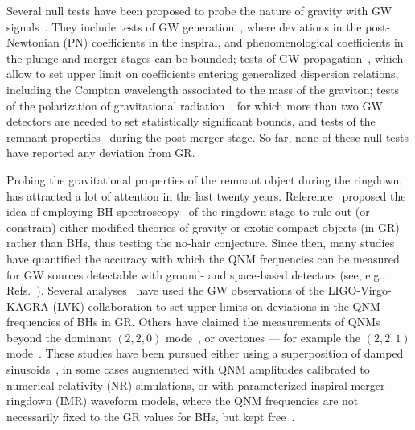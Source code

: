 \documentclass[twocolumn,
               prd,
               aps,
               superscriptaddress,
               tightenlines,
               nofootinbib,
               eqsecnum,
               amsfonts,
               amsmath,
               longbibliography]{revtex4-1}
\begin{document}
Several null tests have been proposed to probe the nature of gravity with GW signals~\cite{TheLIGOScientific:2016src,Yunes:2016jcc,Abbott:2018lct,LIGOScientific:2019fpa,Abbott:2020jks,LIGOScientific:2021sio}. They include tests of GW generation~\cite{Arun:2006yw,Yunes:2009ke,Li:2011cg,Agathos:2013upa,Mehta:2022pcn}, where deviations in the post-Newtonian (PN) coefficients in the inspiral, and phenomenological coefficients in the plunge and merger stages can be bounded; tests of GW propagation~\cite{Will:1997bb}, which allow to set upper limit on coefficients entering generalized dispersion relations, including the Compton wavelength associated to the
mass of the graviton; tests of the polarization of gravitational radiation~\cite{Will:2014kxa}, for which more than
two GW detectors are needed to set statistically significant bounds, and tests of the remnant properties~\cite{Meidam:2014jpa,Carullo:2018sfu,Brito:2018rfr,Carullo:2019flw,Isi:2019aib,Ghosh:2021mrv,Carullo:2021dui}
during the post-merger stage. So far, none of these null tests have reported any deviation from GR.

Probing the gravitational properties of the remnant object during the
ringdown, has attracted a lot of attention in the last twenty years.
Reference~\cite{Dreyer:2003bv} proposed the idea of employing BH spectroscopy~\cite{Detweiler:1980gk}
of the ringdown stage to rule out (or constrain) either modified theories of
gravity or exotic compact objects (in GR) rather than BHs, thus
testing the no-hair conjecture. Since then, many studies have quantified the accuracy
with which the QNM frequencies can be measured for
GW sources detectable with ground- and space-based detectors (see, e.g., Refs.~\cite{Berti:2005ys,Baibhav:2020tma,Bhagwat:2021kwv,Ota:2021ypb}). Several analyses~\cite{Carullo:2018sfu,
Brito:2018rfr,Carullo:2019flw,Isi:2019aib,Ghosh:2021mrv,Carullo:2021dui}
have used the GW observations of the LIGO-Virgo-KAGRA (LVK) collaboration to set upper
limits on deviations in the QNM frequencies of BHs in GR. Others have claimed
the measurements of QNMs beyond the dominant $(2,2,0)$ mode~\cite{Capano:2021etf},
or overtones --- for example the $(2,2,1)$ mode~\cite{Isi:2019aib,Cotesta:2022pci,Isi:2022mhy}.
%
These studies have been pursued either using a superposition
of damped sinusoids~\cite{Giesler:2019uxc,Carullo:2019flw}, in some cases augmemted with QNM amplitudes calibrated to
numerical-relativity (NR) simulations, or with parameterized inspiral-merger-ringdown (IMR)
waveform models, where the QNM frequencies are not necessarily fixed
to the GR values for BHs, but kept free~\cite{Brito:2018rfr,Ghosh:2021mrv}.
\end{document}
